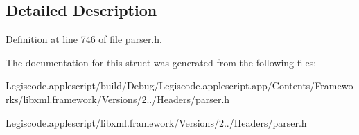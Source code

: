\subsection{Detailed Description}


Definition at line 746 of file parser.\-h.



The documentation for this struct was generated from the following files\-:\begin{DoxyCompactItemize}
\item 
Legiscode.\-applescript/build/\-Debug/\-Legiscode.\-applescript.\-app/\-Contents/\-Frameworks/libxml.\-framework/\-Versions/2../\-Headers/parser.\-h\item 
Legiscode.\-applescript/libxml.\-framework/\-Versions/2../\-Headers/parser.\-h\end{DoxyCompactItemize}
